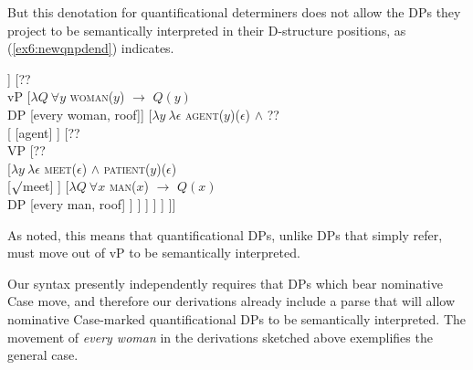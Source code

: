 But this denotation for quantificational determiners does not allow the DPs they project to be semantically interpreted in their D-structure positions, as (\ref{ex6:newqnpdend}) indicates.
\begin{exe}
\raggedright
	\ex \label{ex6:newqnpdend}
	\footnotesize
\begin{forest}
[AspP [\ibar{Asp}
	[\obar{Asp} [asp]]
	[?? \\vP
		[$\lambda Q\ \forall y$ \textsc{woman}($y$) $\rightarrow$ $Q(y)$\\ DP [every woman, roof]]
		[$\lambda y\ \lambda \epsilon$ \textsc{agent}($y$)($\epsilon$) $\wedge$ ?? \\ 
			[ ]
			[??\\VP [??\\
				[$\lambda y\ \lambda \epsilon$ \textsc{meet}($\epsilon$) $\wedge$ \textsc{patient}($y$)($\epsilon$)\\ [$\surd$meet] ]
				[$\lambda Q\ \forall x$ \textsc{man}($x$) $\rightarrow$ $Q(x)$\\DP [every man, roof] ]
			] ]
		 ]
	 ]
]]
\end{forest}	
\end{exe}
As noted, this means that quantificational DPs, unlike DPs that simply refer, must move out of vP to be semantically interpreted.

Our syntax presently independently requires that DPs which bear nominative Case move, and therefore our derivations already include a parse that will allow nominative Case-marked quantificational DPs to be semantically interpreted. The movement of \emph{every woman} in the derivations sketched above exemplifies the general case. 

